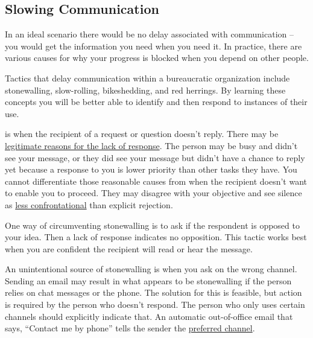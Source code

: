 \subsection*{Slowing Communication\label{sec:slowing-communication}}

In an ideal scenario there would be no delay associated with communication -- you would get the information you need when you need it. In practice, there are various causes for why your progress is blocked when you depend on other people. 

Tactics that delay communication within a bureaucratic organization include stonewalling, slow-rolling, bikeshedding, and red herrings. By learning these concepts you will be better able to identify and then respond to instances of their use.

\iftoggle{glossaryinmargin}{\marginpar{[Glossary]}}{}
\iftoggle{glossarysubstitutionworks}{\Gls{stonewalling}}{Stonewalling} 
is when the recipient of a request or question  doesn't reply. There may be \hyperref[sec:email-responsiveness]{legitimate reasons for the lack of response}.
\iftoggle{haspagenumbers}{\marginpar{See page~\pageref{sec:email-responsiveness}.}}{}%
The person may be busy and didn't see your message, or they did see your message but didn't have a chance to reply yet because a response to you is lower priority than other tasks they have. You cannot differentiate those reasonable causes from when the recipient doesn't want to enable you to proceed. They may disagree with your objective and see silence as \href{https://en.wikipedia.org/wiki/Passive-aggressive_behavior}{less confrontational}
\iftoggle{WPinmargin}{\marginpar{$>$Wikipedia: Passive-aggressive behavior}}{}
than explicit rejection. 

One way of circumventing stonewalling is to ask if the respondent is opposed to your idea. 
%
%
Then a lack of response indicates no opposition. This tactic works best when you are confident the recipient will read or hear the message.

An unintentional source of stonewalling is when you ask on the wrong channel. Sending an email may result in what appears to be stonewalling if the person relies on chat messages or the phone. The solution for this
%
%
is feasible, but action is required by the person who doesn't respond. The person who only uses certain channels should explicitly indicate that. An automatic out-of-office email that says, ``Contact me by phone'' tells the sender the \hyperref[sec:communication-preferences]{preferred channel}. 

